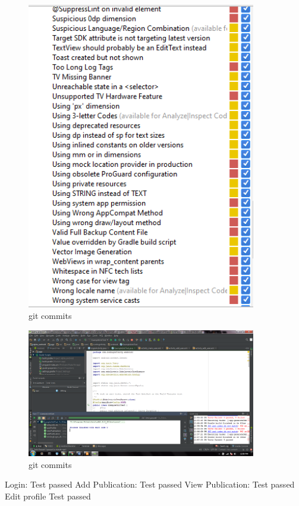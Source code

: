 \begin{figure}[H]
  		\centering
      	\includegraphics[width=100mm]{Capture15}	      	
  		\caption{git commits}
\end{figure}

\begin{figure}[H]
  		\centering
      	\includegraphics[width=100mm]{androidPic1}	      	
  		\caption{git commits}
\end{figure}

Login: Test passed 
Add Publication: Test passed
View Publication: Test passed
Edit profile Test passed
